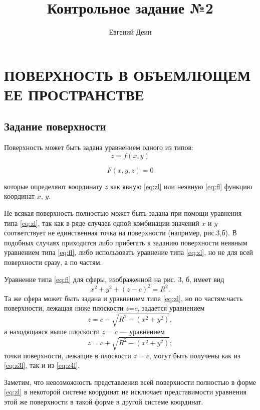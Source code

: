 \documentclass[a4paper,12pt]{article}
\title{Контрольное задание №2}
\author{Евгений Деин}
\begin{document}
  \maketitle
  \section{ПОВЕРХНОСТЬ В ОБЪЕМЛЮЩЕМ ЕЕ ПРОСТРАНСТВЕ}
  \subsection{Задание поверхности}
  Поверхность может быть задана уравнением одного из типов:
  \begin{equation}
    \label{eq:zl}
    z=f(x,y)
  \end{equation}

  \begin{equation}  
    \label{eq:fl}
    F(x,y,z)=0
  \end{equation}

	которые определяют координату $z$ как явную \eqref{eq:zl} или 	неявную \eqref{eq:fl} функцию координат $x$, $y$. 
	
	Не всякая поверхность полностью может быть задана при помощи уравнения типа \eqref{eq:zl}, так как в ряде случаев одной комбинации значений $x$ и $y$ соответствует не единственная точка на поверхности (например, рис.3,б). В подобных случаях приходится либо прибегать к заданию поверхности неявным уравнением типа \eqref{eq:fl}, либо использовать уравнение типа \eqref{eq:zl}, но не для всей поверхности сразу,
	а по частям.

	Уравнение типа \eqref{eq:fl} для сферы, изображенной на рис. 3, б, имеет вид
	\[x^{2} + y^{2} + (z-c)^{2} = R^{2}.\]
	Та же сфера может быть задана и уравнением типа \eqref{eq:zl}, но по частям:часть поверхности, лежащая ниже плоскости $z$=$c$, задается уравнением
	\begin{equation}
	\label{eq:z3l}
	z=c-\sqrt{R^{2} - (x^{2} + y^{2})},
	\end{equation}
	а находящаяся выше плоскости $z = c$ — уравнением
	\begin{equation}
		\label{eq:z4l}
		z=c+\sqrt{R^{2} - (x^{2} + y^{2})};
	\end{equation}
	точки поверхности, лежащие в плоскости $z = c$, могут быть получены как из \eqref{eq:z3l}, так и из \eqref{eq:z4l}.
	
	Заметим, что невозможность представления всей поверхности полностью в форме \eqref{eq:zl} в некоторой системе координат не исключает представимости уравнения этой же поверхности в такой форме в другой системе координат.
\end{document}

